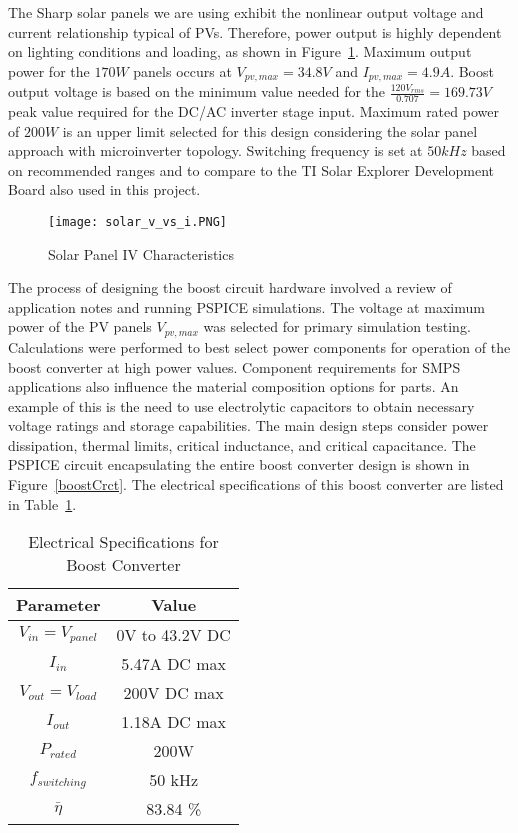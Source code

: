 The Sharp solar panels we are using exhibit the nonlinear output voltage and current relationship typical of PVs. Therefore, power output is highly dependent on lighting conditions and loading, as shown in Figure~\ref{panelCharacteristics}. Maximum output power for the $170W$ panels occurs at $V_{pv,max}=34.8V$ and  $I_{pv,max} = 4.9A$. Boost output voltage is based on the minimum value needed for the $\frac{120V_{rms}}{0.707} = 169.73V$ peak value required for the DC/AC inverter stage input. Maximum rated power of $200W$ is an upper limit selected for this design considering the solar panel approach with microinverter topology. Switching frequency is set at $50 kHz$ based on recommended ranges and to compare to the TI Solar Explorer Development Board also used in this project.\cite{SharpPanel}

\begin{figure}
\centering
\texttt{[image: solar\_v\_vs\_i.PNG]}
\caption{Solar Panel IV Characteristics\cite{SharpPanel}}
\label{panelCharacteristics}
\end{figure}

The process of designing the boost circuit hardware involved a review of application notes and running PSPICE simulations. The voltage at maximum power of the PV panels $V_{pv,max}$ was selected for primary simulation testing. Calculations were performed to best select power components for operation of the boost converter at high power values. Component requirements for SMPS applications also influence the material composition options for parts. An example of this is the need to use electrolytic capacitors to obtain necessary voltage ratings and storage capabilities. The main design steps consider power dissipation, thermal limits, critical inductance, and critical capacitance. The PSPICE circuit encapsulating the entire boost converter design is shown in Figure~\ref{boostCrct}. The electrical specifications of this boost converter are listed in Table~\ref{specsBoost}.
\\ 
\begin{table}
\centering
\begin{tabular}{|c|c|}
\hline
 Parameter & Value \\
 \hline
 $ V_{in} = V_{panel}$ & 0V to 43.2V DC \\
 \hline
 $ I_{in}$ & 5.47A DC max \\
 \hline
 $ V_{out}=V_{load} $ & 200V DC max \\
 \hline
 $ I_{out} $ & 1.18A DC max \\
 \hline
 $ P_{rated} $ & 200W \\
 \hline
 $ f_{switching} $ & 50 kHz \\
 \hline
 $\bar{\eta} $ & 83.84 \% \\
 \hline
\end{tabular}
\caption{Electrical Specifications for Boost Converter}
\label{specsBoost}
\end{table}

